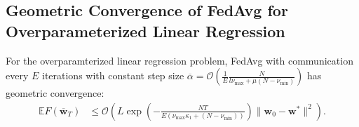 \subsection{Geometric Convergence of FedAvg for Overparameterized Linear Regression}
	
	\begin{thm}
		For the overparamterized linear regression problem, FedAvg with communication every $E$
		iterations with constant step size $\overline{\alpha}=\mathcal{O}(\frac{1}{E}\frac{N}{l\nu_{\max}+\mu(N-\nu_{\min})})$
		has geometric convergence:
		\begin{align*}
		\mathbb{E}F(\overline{\mathbf{w}}_{T}) & \leq\mathcal{O}\left(L\exp(-\frac{NT}{E(\nu_{\max}\kappa_{1}+(N-\nu_{\min}))})\|\mathbf{w}_{0}-\mathbf{w}^{\ast}\|^{2}\right).
		\end{align*}
	\end{thm}
